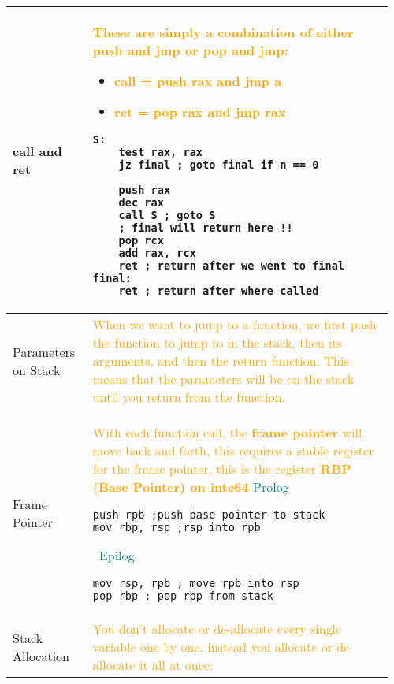 \documentclass[main.tex,fontsize=8pt,paper=a4,paper=portrait,DIV=calc,]{scrartcl}
\begin{document}
\pagebreak
\begin{table}[ht!]
\begin{tabular}{|m{0.2\linewidth}|m{0.755\linewidth}|}
\hline
call and ret & 
\textcolor{orange}{These are simply a combination of either push and jmp or pop and jmp:}\newline
\begin{itemize}
\item \textcolor{orange}{call = push rax and jmp a}
\item \textcolor{orange}{ret = pop rax and jmp rax}
\vspace{-2mm}
\end{itemize} 
\begin{lstlisting}
S: 
    test rax, rax
    jz final ; goto final if n == 0

    push rax
    dec rax
    call S ; goto S
    ; final will return here !!
    pop rcx 
    add rax, rcx
    ret ; return after we went to final 
final:
    ret ; return after where called
\end{lstlisting}\\
\hline
Parameters on Stack & 
\textcolor{orange}{When we want to jump to a function, we first push the function to jump to in the stack, then its arguments, and then the return function.\newline
This means that the parameters will be on the stack until you return from the function.}\\
\hline
Frame Pointer & 
\textcolor{orange}{With each function call, the \textbf{frame pointer} will move back and forth,\newline
this requires a stable register for the frame pointer, this is the register \textbf{RBP (Base Pointer) on inte64}}\newline
\textcolor{teal}{Prolog}\newline
\begin{lstlisting}
push rpb ;push base pointer to stack
mov rbp, rsp ;rsp into rpb
\end{lstlisting} 
\, \newline
\textcolor{teal}{Epilog}\newline
\begin{lstlisting}
mov rsp, rpb ; move rpb into rsp 
pop rbp ; pop rbp from stack
\end{lstlisting}\\
\hline
Stack Allocation& 
\textcolor{orange}{You don't allocate or de-allocate every single variable one by one, instead you allocate or de-allocate it all at once:}\newline

\end{tabular}
\end{table}
\end{document}
